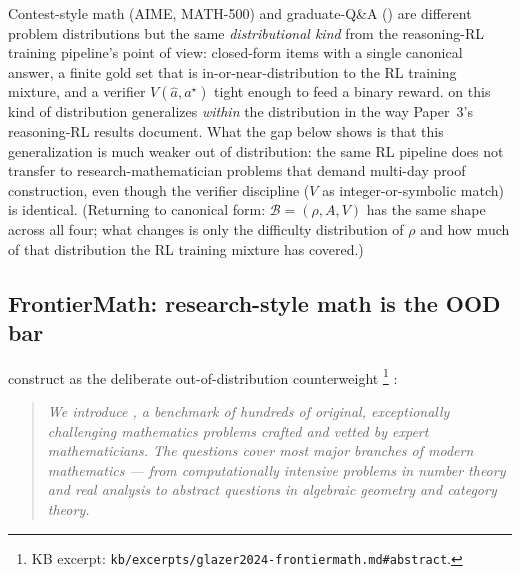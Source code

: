 \begin{intuition}
Contest-style math (AIME, MATH-500) and graduate-Q\&A
() are different problem distributions but the same
\emph{distributional kind} from the reasoning-RL training pipeline's
point of view: closed-form items with a single canonical answer, a
finite gold set that is in-or-near-distribution to the RL training
mixture, and a verifier $V(\hat{a}, a^\star)$ tight enough to feed a
binary reward.  on this kind of distribution generalizes
\emph{within} the distribution in the way Paper~3's reasoning-RL
results document. What the  gap below shows is that this
generalization is much weaker out of distribution: the same RL
pipeline does not transfer to research-mathematician problems that
demand multi-day proof construction, even though the verifier
discipline ($V$ as integer-or-symbolic match) is identical.
(Returning to canonical form: $\mathcal{B} = (\rho, A, V)$ has the
same shape across all four; what changes is only the difficulty
distribution of $\rho$ and how much of that distribution the RL
training mixture has covered.)
\end{intuition}

\subsection{FrontierMath: research-style math is the OOD bar}
\label{sec:reasoning-frontiermath}

\citet{glazer2024-frontiermath} construct  as the
deliberate out-of-distribution counterweight%
\footnote{KB excerpt: \texttt{kb/excerpts/glazer2024-frontiermath.md\#abstract}.}
\citep[\S{}abstract]{glazer2024-frontiermath}:

\begin{quote}\itshape
We introduce , a benchmark of hundreds of original,
exceptionally challenging mathematics problems crafted and vetted by
expert mathematicians. The questions cover most major branches of
modern mathematics --- from computationally intensive problems in
number theory and real analysis to abstract questions in algebraic
geometry and category theory.
\end{quote}

